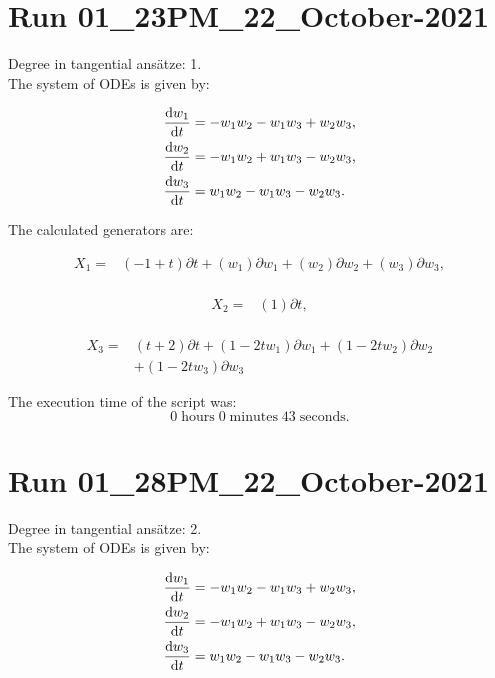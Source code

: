 \section*{Run 01\_23PM\_22\_October-2021}
Degree in tangential ansätze:	1.\\
The system of ODEs is given by:

\begin{align*}
\dv{w_{1}}{t}&=- w_{1} w_{2} - w_{1} w_{3} + w_{2} w_{3},\\
\dv{w_{2}}{t}&=- w_{1} w_{2} + w_{1} w_{3} - w_{2} w_{3},\\
\dv{w_{3}}{t}&=w_{1} w_{2} - w_{1} w_{3} - w_{2} w_{3}.\\
\end{align*}

\noindent The calculated generators are:

\begin{align*}
X_{1}=&\left(-1+t \right)\partial t+\left(w_{1} \right)\partial w_{1}+\left(w_{2} \right)\partial w_{2}+\left(w_{3} \right)\partial w_{3},\\
\end{align*}

\begin{align*}
X_{2}=&\left(1 \right)\partial t,\\
\end{align*}

\begin{align*}
X_{3}=&\left(t+2 \right)\partial t+\left(1- 2 t w_{1} \right)\partial w_{1}+\left(1- 2 t w_{2} \right)\partial w_{2}\\
&+\left(1- 2 t w_{3} \right)\partial w_{3}
\end{align*}

\noindent The execution time of the script was:
$$0\;\mathrm{hours}\;0\;\mathrm{minutes}\;43 \;\mathrm{seconds}.$$
\section*{Run 01\_28PM\_22\_October-2021}
Degree in tangential ansätze:	2.\\
The system of ODEs is given by:

\begin{align*}
\dv{w_{1}}{t}&=- w_{1} w_{2} - w_{1} w_{3} + w_{2} w_{3},\\
\dv{w_{2}}{t}&=- w_{1} w_{2} + w_{1} w_{3} - w_{2} w_{3},\\
\dv{w_{3}}{t}&=w_{1} w_{2} - w_{1} w_{3} - w_{2} w_{3}.\\
\end{align*}

